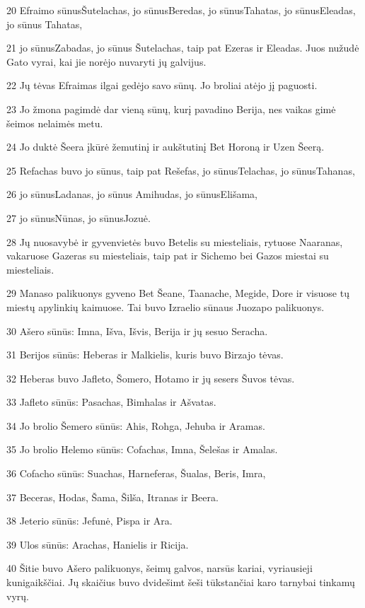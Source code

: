 \par 20 Efraimo sūnus­Šutelachas, jo sūnus­Beredas, jo sūnus­Tahatas, jo sūnus­Eleadas, jo sūnus­ Tahatas, 
\par 21 jo sūnus­Zabadas, jo sūnus­ Šutelachas, taip pat Ezeras ir Eleadas. Juos nužudė Gato vyrai, kai jie norėjo nuvaryti jų galvijus. 
\par 22 Jų tėvas Efraimas ilgai gedėjo savo sūnų. Jo broliai atėjo jį paguosti. 
\par 23 Jo žmona pagimdė dar vieną sūnų, kurį pavadino Berija, nes vaikas gimė šeimos nelaimės metu. 
\par 24 Jo duktė Šeera įkūrė žemutinį ir aukštutinį Bet Horoną ir Uzen Šeerą. 
\par 25 Refachas buvo jo sūnus, taip pat Rešefas, jo sūnus­Telachas, jo sūnus­Tahanas, 
\par 26 jo sūnus­Ladanas, jo sūnus­ Amihudas, jo sūnus­Elišama, 
\par 27 jo sūnus­Nūnas, jo sūnus­Jozuė. 
\par 28 Jų nuosavybė ir gyvenvietės buvo Betelis su miesteliais, rytuose Naaranas, vakaruose Gazeras su miesteliais, taip pat ir Sichemo bei Gazos miestai su miesteliais. 
\par 29 Manaso palikuonys gyveno Bet Šeane, Taanache, Megide, Dore ir visuose tų miestų apylinkių kaimuose. Tai buvo Izraelio sūnaus Juozapo palikuonys. 
\par 30 Ašero sūnūs: Imna, Išva, Išvis, Berija ir jų sesuo Seracha. 
\par 31 Berijos sūnūs: Heberas ir Malkielis, kuris buvo Birzajo tėvas. 
\par 32 Heberas buvo Jafleto, Šomero, Hotamo ir jų sesers Šuvos tėvas. 
\par 33 Jafleto sūnūs: Pasachas, Bimhalas ir Ašvatas. 
\par 34 Jo brolio Šemero sūnūs: Ahis, Rohga, Jehuba ir Aramas. 
\par 35 Jo brolio Helemo sūnūs: Cofachas, Imna, Šelešas ir Amalas. 
\par 36 Cofacho sūnūs: Suachas, Harneferas, Šualas, Beris, Imra, 
\par 37 Beceras, Hodas, Šama, Šilša, Itranas ir Beera. 
\par 38 Jeterio sūnūs: Jefunė, Pispa ir Ara. 
\par 39 Ulos sūnūs: Arachas, Hanielis ir Ricija. 
\par 40 Šitie buvo Ašero palikuonys, šeimų galvos, narsūs kariai, vyriausieji kunigaikščiai. Jų skaičius buvo dvidešimt šeši tūkstančiai karo tarnybai tinkamų vyrų.



